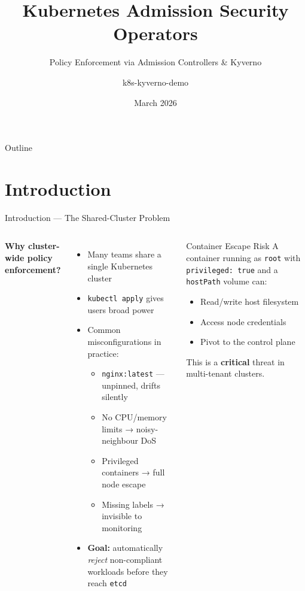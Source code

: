 \documentclass[aspectratio=169,10pt]{beamer}
\title{Kubernetes Admission Security Operators}
\subtitle{Policy Enforcement via Admission Controllers \& Kyverno}
\author{k8s-kyverno-demo}
\date{March 2026}
\institute{Kubernetes Security}
\begin{document}

\begin{frame}
  \titlepage
\end{frame}

\begin{frame}{Outline}
  \tableofcontents[hideallsubsections]
\end{frame}

\section{Introduction}

\begin{frame}{Introduction — The Shared-Cluster Problem}
  \begin{columns}[T]
      \textbf{Why cluster-wide policy enforcement?}
      \begin{itemize}
        \item Many teams share a single Kubernetes cluster
        \item \texttt{kubectl apply} gives users broad power
        \item Common misconfigurations in practice:
          \begin{itemize}
            \item \texttt{nginx:latest} — unpinned, drifts silently
            \item No CPU/memory limits → noisy-neighbour DoS
            \item Privileged containers → full node escape
            \item Missing labels → invisible to monitoring
          \end{itemize}
        \item \textbf{Goal:} automatically \emph{reject} non-compliant
              workloads before they reach \texttt{etcd}
      \end{itemize}
      \begin{alertblock}{Container Escape Risk}
        A container running as \texttt{root} with \texttt{privileged: true}
        and a \texttt{hostPath} volume can:
        \begin{itemize}
          \item Read/write host filesystem
          \item Access node credentials
          \item Pivot to the control plane
        \end{itemize}
        This is a \textbf{critical} threat in multi-tenant clusters.
      \end{alertblock}
  \end{columns}
\end{frame}
\end{document}
